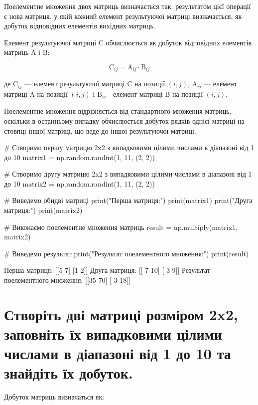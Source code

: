 \documentclass[]{article}
\newcounter{pythoncode}
\begin{document}
Поелементне множення двох матриць визначається так: результатом цієї
операції є нова матриця, у якій кожний елемент результуючої матриці
визначається, як добуток відповідних елементів вихідних матриць.

Елемент результуючої матриці \(\mathrm C\) обчислюється як добуток
відповідних елементів матриць \(\mathrm A\) і \(\mathrm B\):

\[
	\mathrm C_{ij}  = \mathrm A_{ij} \cdot \mathrm B_{ij}
\]

де \(\mathrm C_{ij}\) --- елемент результуючої матриці \(\mathrm C\) на
позиції \((i, j)\), \(\mathrm A_{ij}\) --- елемент матриці \(\mathrm A\)
на позиції \((i, j)\) і \(\mathrm B_{ij}\) - елемент матриці
\(\mathrm B\) на позиції \((i, j)\).

Поелементне множення відрізняється від стандартного множення матриць,
оскільки в останньому випадку обчислюється добуток рядків однієї матриці
на стовпці іншої матриці, що веде до іншої результуючої матриці.

\begin{pythoncode}
    # Створимо першу матрицю 2x2 з випадковими цілими числами в діапазоні від 1 до 10
    matrix1 = np.random.randint(1, 11, (2, 2))

    # Створимо другу матрицю 2x2 з випадковими цілими числами в діапазоні від 1 до 10
    matrix2 = np.random.randint(1, 11, (2, 2))

    # Виведемо обидві матриці
    print("Перша матриця:")
    print(matrix1)
    print("Друга матриця:")
    print(matrix2)

    # Виконаємо поелементне множення матриць
    result = np.multiply(matrix1, matrix2)

    # Виведемо результат
    print("Результат поелементного множення:")
    print(result)
\end{pythoncode}

\begin{out}
	Перша матриця:
	[[5 7]
	 [1 2]]
	Друга матриця:
	[[ 7 10]
	 [ 3  9]]
	Результат поелементного множення:
	[[35 70]
	 [ 3 18]]
\end{out}

\section{Створіть дві матриці розміром 2x2, заповніть їх випадковими цілими числами в діапазоні від 1 до 10 та знайдіть їх добуток.}

Добуток матриць визначаться як:
\end{document}
